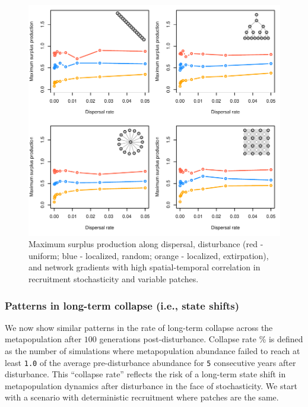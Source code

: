 \documentclass[
]{article}
\begin{document}
\begin{figure}[H]

{\centering \includegraphics{Managing_for_ecological_surprises_in_metapopulations_files/figure-latex/MSY with variable patches and space-time stochasticity-1} 

}

\caption{Maximum surplus production along dispersal, disturbance (red - uniform; blue - localized, random; orange - localized, extirpation), and network gradients with high spatial-temporal correlation in recruitment stochasticity and variable patches.}\label{fig:MSY with variable patches and space-time stochasticity}
\end{figure}

\newpage

\hypertarget{patterns-in-long-term-collapse-i.e.-state-shifts}{%
\subsubsection{Patterns in long-term collapse (i.e., state
shifts)}\label{patterns-in-long-term-collapse-i.e.-state-shifts}}

We now show similar patterns in the rate of long-term collapse across
the metapopulation after \(100\) generations post-disturbance. Collapse
rate \% is defined as the number of simulations where metapopulation
abundance failed to reach at least \texttt{1.0} of the average
pre-disturbance abundance for \texttt{5} consecutive years after
disturbance. This ``collapse rate'' reflects the risk of a long-term
state shift in metapopulation dynamics after disturbance in the face of
stochasticity. We start with a scenario with deterministic recruitment
where patches are the same.
\end{document}
